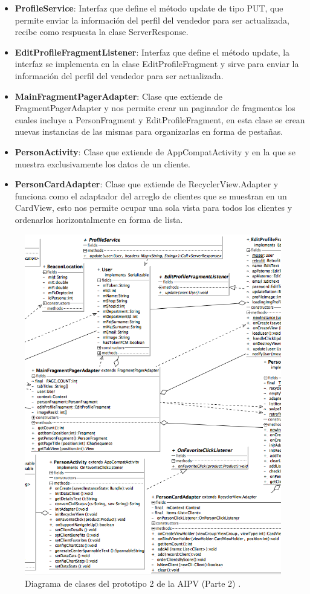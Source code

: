 \begin{itemize}
\item \textbf{ProfileService}: Interfaz que define el método update de tipo PUT, que permite enviar la información del perfil del vendedor para ser actualizada, recibe como respuesta la clase ServerResponse.
\item \textbf{EditProfileFragmentListener}: Interfaz que define el método update, la interfaz se implementa en la clase EditProfileFragment y sirve para enviar la información del perfil del vendedor para ser actualizada.
\item \textbf{MainFragmentPagerAdapter}: Clase que extiende de FragmentPagerAdapter y nos permite crear un paginador de fragmentos los cuales incluye a PersonFragment y EditProfileFragment, en esta clase se crean nuevas instancias de las mismas para organizarlas en forma de pestañas.
\item \textbf{PersonActivity}: Clase que extiende de AppCompatActivity y en la que se muestra exclusivamente los datos de un cliente.
\item \textbf{PersonCardAdapter}: Clase que extiende de RecyclerView.Adapter y funciona como el adaptador del arreglo de clientes que se muestran en un CardView, esto nos permite ocupar una sola vista para todos los clientes y ordenarlos horizontalmente en forma de lista.

\end{itemize}

\FloatBarrier
\begin{figure}[htbp!]
		\centering
			\includegraphics[width=.9 \textwidth]{imagenes/adrian/vendedor/prototipo2/clases_2}
		\caption{Diagrama de clases del prototipo 2 de la AIPV (Parte 2) .}
		\label{clases-AIPV2-parte2}
\end{figure}
\FloatBarrier

